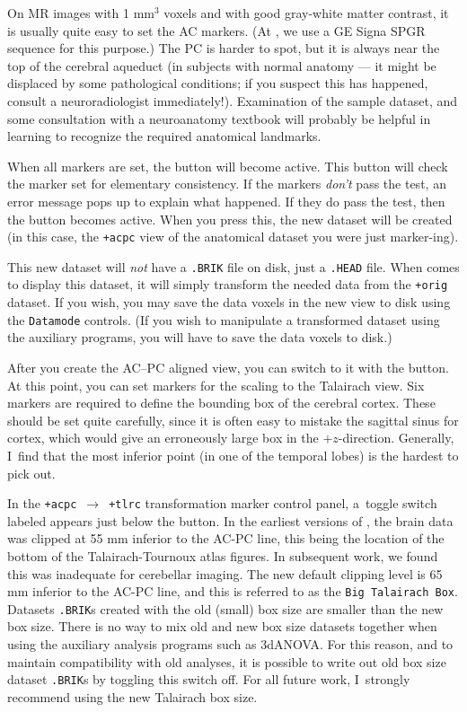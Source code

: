 On MR images with 1 mm$^3$ voxels and with good gray-white matter
contrast, it is usually quite easy to set the
AC markers.  (At \MCW, we use a GE Signa SPGR sequence for this purpose.)
The PC is harder to spot, but it is always near the
top of the cerebral aqueduct (in subjects with normal anatomy --- it might
be displaced by some pathological conditions; if you suspect this has
happened, consult a neuroradiologist immediately!).
Examination of the sample \afnit dataset, and some consultation with a
neuroanatomy textbook will probably be helpful
in learning to recognize the required anatomical landmarks.

When all markers are set, the  button will become active.
This button will check the marker set for elementary consistency.
If the markers {\it don't\/} pass the test, an error message pops up
to explain what happened.  If they do pass the test, then the
 button becomes active.  When you press this, the
new dataset will be created (in this case, the {\tt +acpc} view of the
anatomical dataset you were just marker-ing).

This new dataset will {\it not\/} have a {\tt .BRIK} file
on disk, just a {\tt .HEAD} file.  When \afnit comes to display this
dataset, it will simply transform the needed data from the {\tt +orig}
dataset.  If you wish, you may save the data voxels in the new view
to disk using the {\tt Datamode} controls.
(If you wish to manipulate a transformed
dataset using the auxiliary programs, you will have
to save the data voxels to disk.)

After you create the AC--PC aligned view, you can switch to it with
the  button.
At this point, you can set markers for the scaling to the
Talairach view.  Six markers are required to define the bounding box
of the cerebral cortex.  These should be set quite carefully, since
it is often easy to mistake the sagittal sinus for cortex, which would
give an erroneously large box in the $+z$-direction.  Generally, I~find
that the most inferior point (in one of the temporal lobes) is the hardest to pick out.

In the {\tt +acpc}~$\to$~{\tt +tlrc} transformation marker control
panel, a~toggle switch labeled  appears
just below the  button.  In the earliest versions
of \afni, the brain data was clipped at 55 mm inferior to the AC-PC line,
this being the location of the bottom of the Talairach-Tournoux atlas figures.
In subsequent work, we found this was inadequate for cerebellar
imaging.  The new default clipping level is 65 mm inferior to the AC-PC line,
and this is referred to as the {\tt Big Talairach Box}.  Datasets {\tt .BRIK}s
created with the old (small) box size are smaller than the new box size.
There is no way to mix old and new box size datasets together when
using the auxiliary analysis programs such as {\sf 3dANOVA}.
For this reason, and to maintain compatibility with old analyses,
it is possible to write out old box size dataset {\tt .BRIK}s
by toggling this switch off.  For all future work, I~strongly recommend
using the new Talairach box size.


